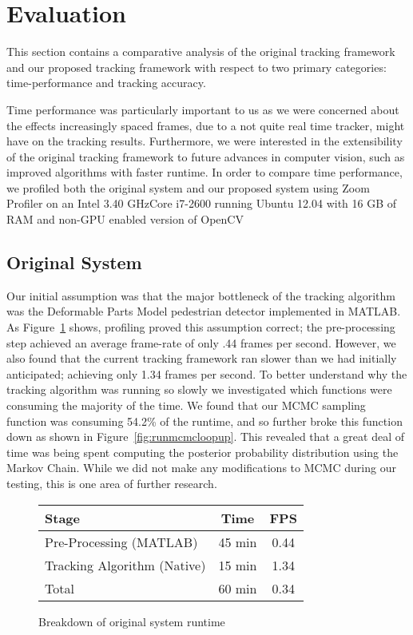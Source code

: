 \section{Evaluation}
\label{sec:eval}

This section contains a comparative analysis of the original tracking framework and our proposed tracking framework with
respect to two primary categories: time-performance and tracking accuracy.

Time performance was particularly important to us as we were concerned about the effects increasingly spaced frames, due to a
not quite real time tracker, might have on the tracking results.  Furthermore, we were interested in the extensibility of the original
tracking framework to future advances in computer vision, such as improved algorithms with faster runtime.  In order to compare
time performance, we profiled both the original system and our proposed system using Zoom Profiler \cite{zoom2013} on an Intel
3.40 GHzCore i7-2600 running Ubuntu 12.04 with 16 GB of RAM and non-GPU enabled version of OpenCV

\subsection{Original System}
	Our initial assumption was that the major bottleneck of the tracking algorithm was the Deformable Parts Model pedestrian
	detector implemented in MATLAB.  As  Figure~\ref{fig:originalruntime} shows, profiling proved this assumption correct; the
	pre-processing step achieved an average frame-rate of only .44 frames per second.  However, we also found that the
	current tracking framework ran slower than we had initially anticipated; achieving only 1.34 frames per second.  To better
	understand why the tracking algorithm was running so slowly we investigated which functions were consuming the majority
	of the time.  We found that our MCMC sampling function was consuming 54.2\% of the runtime, and so further broke this
	function down as shown in Figure~\ref{fig:runmcmcloopup}.  This revealed that a great deal of time was being spent
	computing the posterior probability distribution using the Markov Chain.  While we did not make any modifications to MCMC
	during our testing, this is one area of further research.
	
	\begin{figure}[!ht]
		\centering
		\begin{tabularx}{0.45\textwidth}{ | X | c | c |}
			\hline
			\textbf{Stage}					&	\textbf{Time}	& 	\textbf{FPS} \\ \hline
			Pre-Processing (MATLAB)		&	45 min		&	0.44 \\ \hline
			Tracking Algorithm (Native)		& 	15 min		&	1.34 \\ \hline
			Total							&	60 min		& 	0.34 \\ \hline
		\end{tabularx}
		\caption{Breakdown of original system runtime}
		\label{fig:originalruntime}
	\end{figure}
	
